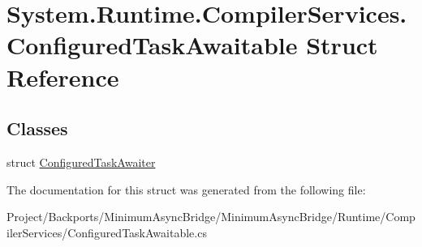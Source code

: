 \hypertarget{struct_system_1_1_runtime_1_1_compiler_services_1_1_configured_task_awaitable}{}\section{System.\+Runtime.\+Compiler\+Services.\+Configured\+Task\+Awaitable Struct Reference}
\label{struct_system_1_1_runtime_1_1_compiler_services_1_1_configured_task_awaitable}
\subsection*{Classes}
\begin{DoxyCompactItemize}
\item 
struct \hyperlink{struct_system_1_1_runtime_1_1_compiler_services_1_1_configured_task_awaitable_1_1_configured_task_awaiter}{Configured\+Task\+Awaiter}
\end{DoxyCompactItemize}


The documentation for this struct was generated from the following file\+:\begin{DoxyCompactItemize}
\item 
Project/\+Backports/\+Minimum\+Async\+Bridge/\+Minimum\+Async\+Bridge/\+Runtime/\+Compiler\+Services/Configured\+Task\+Awaitable.\+cs\end{DoxyCompactItemize}
